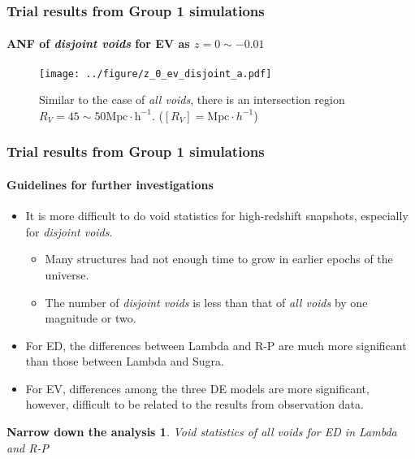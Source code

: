 \documentclass{beamer}
\newtheorem{Narrow down the analysis}{Narrow down the analysis}
\begin{document}
\begin{frame}
	\frametitle{Trial results from Group 1 simulations}
	\framesubtitle{ANF of \textit{disjoint voids} for EV as $z=0\sim -0.01$}
	\pause 
\begin{figure}
\centering
\texttt{[image: ../figure/z\_0\_ev\_disjoint\_a.pdf]}
\caption{Similar to the case of \textit{all voids}, there is an intersection region $R_{V}=45\sim 50\mathrm{Mpc\cdot h^{-1}}$. ($[R_{V}]=\mathrm{Mpc}\cdot h^{-1}$)}
\label{6}
\end{figure}
\end{frame}

\begin{frame}
	\frametitle{Trial results from Group 1 simulations}
	\framesubtitle{Guidelines for further investigations}
	\begin{itemize}
	\pause\item It is more difficult to do void statistics for high-redshift snapshots, especially for \textit{disjoint voids}.
		\begin{itemize}
		\pause \item Many structures had not enough time to grow in earlier epochs of the universe.
		\item The number of \textit{disjoint voids} is less than that of \textit{all voids} by one magnitude or two.
		\end{itemize}
	\pause \item For ED, the differences between Lambda and R-P are much more significant than those between Lambda and Sugra.
	\pause \item For EV, differences among the three DE models are more significant, however, difficult to be related to the results from observation data.\\
	\end{itemize}
	\pause
	\begin{Narrow down the analysis} %
         Void statistics of \textit{all voids} for ED in Lambda and R-P 
    \end{Narrow down the analysis}
\end{frame}
\end{document}
